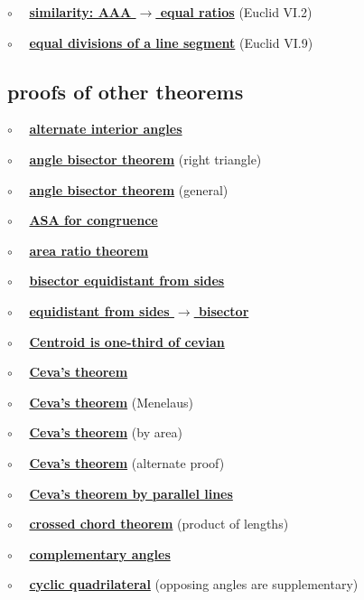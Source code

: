 \documentclass[11pt, oneside]{article}
\begin{document}
$\circ$ \ \ \hyperref[sec:Euclid_VI_2]{\textbf{similarity:  AAA $\rightarrow$ equal ratios}} (Euclid VI.2)

$\circ$ \ \ \hyperref[sec:Euclid_VI_9]{\textbf{equal divisions of a line segment}} (Euclid VI.9)


\subsection*{proofs of other theorems}

$\circ$ \ \  \hyperref[sec:alternate_interior_angle_theorem]{\textbf{alternate interior angles}}

$\circ$ \ \ \hyperref[sec:angle_bisector_theorem]{\textbf{angle bisector theorem}} (right triangle)

$\circ$ \ \ \hyperref[sec:generalized_angle_bisector_theorem]{\textbf{angle bisector theorem}} (general)

$\circ$ \ \ \hyperref[sec:ASA]{\textbf{ASA for congruence}}

$\circ$ \ \ \hyperref[sec:area_ratio_theorem]{\textbf{area ratio theorem}}

$\circ$ \ \ \hyperref[sec:bisector_equidistant_sides]{\textbf{bisector equidistant from sides}}

$\circ$ \ \ \hyperref[sec:bisector_equidistant_sides_converse]{\textbf{equidistant from sides $\rightarrow$ bisector}}

$\circ$ \ \ \hyperref[sec:centroid_one_third]{\textbf{Centroid is one-third of cevian}}

$\circ$ \ \ \hyperref[sec:Ceva_theorem]{\textbf{Ceva's theorem}}

$\circ$ \ \ \hyperref[sec:ceva_by_menlaus]{\textbf{Ceva's theorem}} (Menelaus)

$\circ$ \ \ \hyperref[sec:ceva_by_area]{\textbf{Ceva's theorem}} (by area)

$\circ$ \ \ \hyperref[sec:ceva_alternate_proof]{\textbf{Ceva's theorem}} (alternate proof)

$\circ$ \ \ \hyperref[sec:ceva_parallel_lines]{\textbf{Ceva's theorem by parallel lines}}

$\circ$ \ \ \hyperref[sec:Euclid_III_35]{\textbf{crossed chord theorem}} (product of lengths)

$\circ$ \ \ \hyperref[sec:complementary_angle_theorem]{\textbf{complementary angles}}

$\circ$ \ \ \hyperref[sec:quadrilateral_supplementary]{\textbf{cyclic quadrilateral}} (opposing angles are supplementary)
\end{document}
